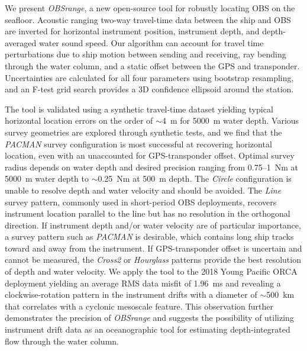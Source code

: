 We present \textit{OBSrange}, a new open-source tool for robustly locating OBS on the seafloor. Acoustic ranging two-way travel-time data between the ship and OBS are inverted for horizontal instrument position, instrument depth, and depth-averaged water sound speed. Our algorithm can account for travel time perturbations due to ship motion between sending and receiving, ray bending through the water column, and a static offset between the GPS and transponder. Uncertainties are calculated for all four parameters using bootstrap resampling, and an F-test grid search provides a 3D confidence ellipsoid around the station. 

The tool is validated using a synthetic travel-time dataset yielding typical horizontal location errors on the order of $\sim$4~m for 5000~m water depth. Various survey geometries are explored through synthetic tests, and we find that the \textit{PACMAN} survey configuration is most successful at recovering horizontal location, even with an unaccounted for GPS-transponder offset. Optimal survey radius depends on water depth and desired precision ranging from 0.75--1~Nm at 5000~m water depth to $\sim$0.25~Nm at 500~m depth. The \textit{Circle} configuration is unable to resolve depth and water velocity and should be avoided. The \textit{Line} survey pattern, commonly used in short-period OBS deployments, recovers instrument location parallel to the line but has no resolution in the orthogonal direction. If instrument depth and/or water velocity are of particular importance, a survey pattern such as \textit{PACMAN} is desirable, which contains long ship tracks toward and away from the instrument. If GPS-transponder offset is uncertain and cannot be measured, the \textit{Cross2} or \textit{Hourglass} patterns provide the best resolution of depth and water velocity. We apply the tool to the 2018 Young Pacific ORCA deployment yielding an average RMS data misfit of 1.96~ms and revealing a clockwise-rotation pattern in the instrument drifts with a diameter of $\sim$500~km that correlates with a cyclonic mesoscale feature. This observation further demonstrates the precision of \textit{OBSrange} and suggests the possibility of utilizing instrument drift data as an oceanographic tool for estimating depth-integrated flow through the water column.